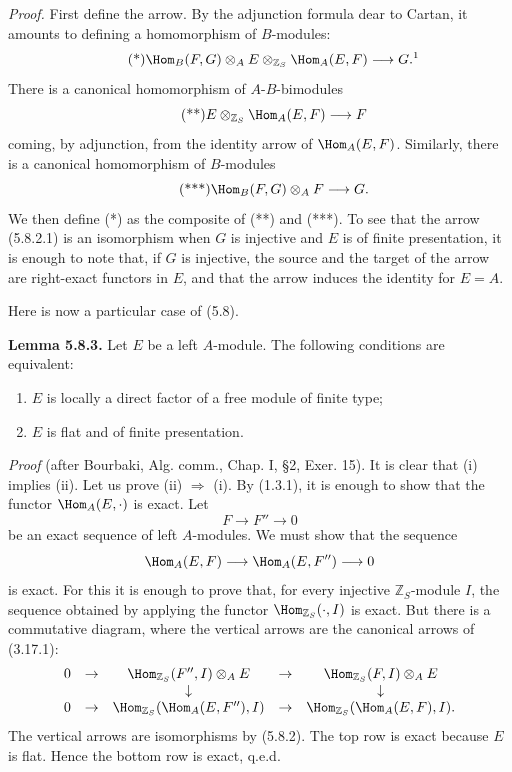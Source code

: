 \emph{Proof.} First define the arrow. By the adjunction formula dear to Cartan, it amounts to defining a homomorphism of \(B\)-modules:
\begin{equation}\tag{*}
  \Hom_B(F,G)\otimes_A E\otimes_{\mathbb Z_S}\Hom_A(E,F)
  \longrightarrow G.\text{\footnotemark}
\end{equation}
There is a canonical homomorphism of \(A\)-\(B\)-bimodules
\begin{equation}\tag{**}
  E\otimes_{\mathbb Z_S}\Hom_A(E,F)
  \longrightarrow F
\end{equation}
coming, by adjunction, from the identity arrow of \(\Hom_A(E,F)\). Similarly, there is a canonical homomorphism of \(B\)-modules
\begin{equation}\tag{***}
  \Hom_B(F,G)\otimes_A F\longrightarrow G.
\end{equation}
We then define (*) as the composite of (**) and (***). To see that the arrow (5.8.2.1) is an isomorphism when \(G\) is injective and \(E\) is of finite presentation, it is enough to note that, if \(G\) is injective, the source and the target of the arrow are right-exact functors in \(E\), and that the arrow induces the identity for \(E=A\).

Here is now a particular case of (5.8).

\textbf{Lemma 5.8.3.} Let \(E\) be a left \(A\)-module. The following conditions are equivalent:
\begin{enumerate}[label=(\roman*)]
\item \(E\) is locally a direct factor of a free module of finite type;
\item \(E\) is flat and of finite presentation.
\end{enumerate}

\emph{Proof} (after Bourbaki, Alg. comm., Chap. I, §2, Exer. 15). It is clear that (i) implies (ii). Let us prove (ii) \(\Rightarrow\) (i). By (1.3.1), it is enough to show that the functor \(\Hom_A(E,\cdot)\) is exact. Let
\[
  F\longrightarrow F''\longrightarrow 0
\]
be an exact sequence of left \(A\)-modules. We must show that the sequence
\[
  \Hom_A(E,F)\longrightarrow \Hom_A(E,F'')\longrightarrow 0
\]
is exact. For this it is enough to prove that, for every injective \(\mathbb Z_S\)-module \(I\), the sequence obtained by applying the functor \(\Hom_{\mathbb Z_S}(\cdot,I)\) is exact. But there is a commutative diagram, where the vertical arrows are the canonical arrows of (3.17.1):
\[
\begin{array}{ccccccccc}
0&\to&\Hom_{\mathbb Z_S}(F'',I)\otimes_A E&\to&\Hom_{\mathbb Z_S}(F,I)\otimes_A E\\
&&\downarrow&&\downarrow\\
0&\to&\Hom_{\mathbb Z_S}(\Hom_A(E,F''),I)&\to&\Hom_{\mathbb Z_S}(\Hom_A(E,F),I).
\end{array}
\]
The vertical arrows are isomorphisms by (5.8.2). The top row is exact because \(E\) is flat. Hence the bottom row is exact, q.e.d.


